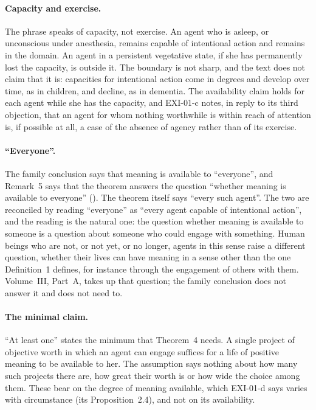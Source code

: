 \paragraph{Capacity and exercise.} The phrase speaks of capacity, not exercise. An agent who is asleep, or unconscious under anesthesia, remains capable of intentional action and remains in the domain. An agent in a persistent vegetative state, if she has permanently lost the capacity, is outside it. The boundary is not sharp, and the text does not claim that it is: capacities for intentional action come in degrees and develop over time, as in children, and decline, as in dementia. The availability claim holds for each agent while she has the capacity, and EXI-01-c notes, in reply to its third objection, that an agent for whom nothing worthwhile is within reach of attention is, if possible at all, a case of the absence of agency rather than of its exercise.

\paragraph{\enquote{Everyone}.} The family conclusion says that meaning is available to \enquote{everyone}, and Remark~5 says that the theorem answers the question \enquote{whether meaning is available to everyone} (). The theorem itself says \enquote{every such agent}. The two are reconciled by reading \enquote{everyone} as \enquote{every agent capable of intentional action}, and the reading is the natural one: the question whether meaning is available to someone is a question about someone who could engage with something. Human beings who are not, or not yet, or no longer, agents in this sense raise a different question, whether their lives can have meaning in a sense other than the one Definition~1 defines, for instance through the engagement of others with them. Volume~III, Part~A, takes up that question; the family conclusion does not answer it and does not need to.


\paragraph{The minimal claim.} \enquote{At least one} states the minimum that Theorem~4 needs. A single project of objective worth in which an agent can engage suffices for a life of positive meaning to be available to her. The assumption says nothing about how many such projects there are, how great their worth is or how wide the choice among them. These bear on the degree of meaning available, which EXI-01-d says varies with circumstance (its Proposition~2.4), and not on its availability.

